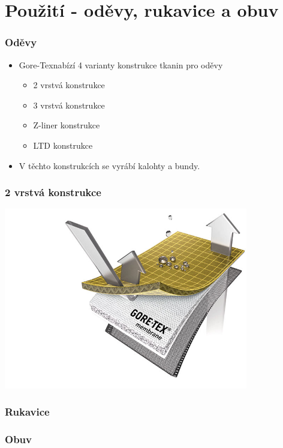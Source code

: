 \section{Použití - oděvy, rukavice a obuv}

\begin{frame}
	\frametitle{Oděvy}
	
	\begin{itemize}
		\item Gore-Tex\textregistered nabízí 4 varianty konstrukce tkanin pro oděvy
		\begin{itemize}
			\item 2 vrstvá konstrukce %
			\item 3 vrstvá konstrukce %
			\item Z-liner konstrukce %
			\item LTD konstrukce %
		\end{itemize}
	  	\item V těchto konstrukcích se vyrábí kalohty a bundy.
	  
	\end{itemize}
	
\end{frame}
\begin{frame}
	\frametitle{2 vrstvá konstrukce}
		\includegraphics[width=0.8\textwidth]{bunda_close.jpg}
	
\end{frame}

\begin{frame}
	\frametitle{Rukavice}
	
\end{frame}

\begin{frame}
	\frametitle{Obuv}
	
\end{frame}
